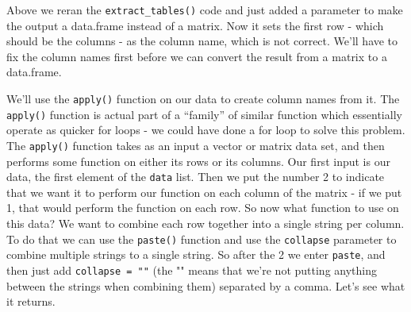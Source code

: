 \documentclass[
  12pt,
]{book}
\begin{document}
Above we reran the \texttt{extract\_tables()} code and just added a parameter to make the output a data.frame instead of a matrix. Now it sets the first row - which should be the columns - as the column name, which is not correct. We'll have to fix the column names first before we can convert the result from a matrix to a data.frame.

We'll use the \texttt{apply()} function on our data to create column names from it. The \texttt{apply()} function is actual part of a ``family'' of similar function which essentially operate as quicker for loops - we could have done a for loop to solve this problem. The \texttt{apply()} function takes as an input a vector or matrix data set, and then performs some function on either its rows or its columns. Our first input is our data, the first element of the \texttt{data} list. Then we put the number 2 to indicate that we want it to perform our function on each column of the matrix - if we put 1, that would perform the function on each row. So now what function to use on this data? We want to combine each row together into a single string per column. To do that we can use the \texttt{paste()} function and use the \texttt{collapse} parameter to combine multiple strings to a single string. So after the 2 we enter \texttt{paste}, and then just add \texttt{collapse\ =\ ""} (the "" means that we're not putting anything between the strings when combining them) separated by a comma. Let's see what it returns.
\end{document}
